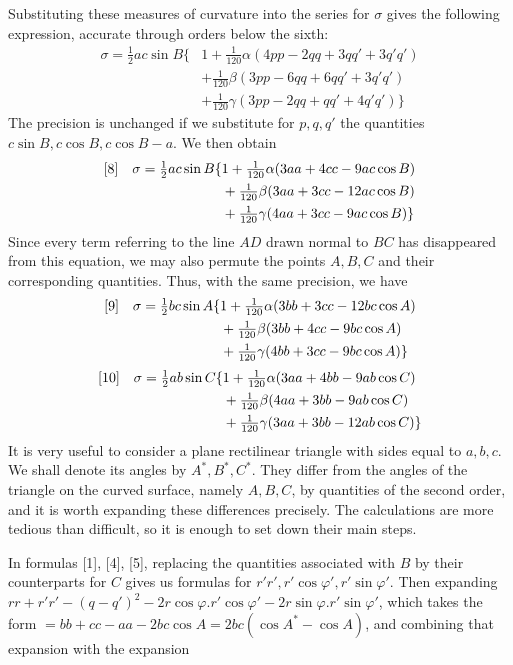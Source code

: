 %
Substituting these measures of curvature into the series for \(\sigma\) gives the following expression, accurate through orders below the sixth:
\[
\begin{aligned}
\sigma=\tfrac{1}{2}ac\sin B\{&1+\tfrac{1}{120}\alpha(4pp-2qq+3qq'+3q'q')\\
&+\tfrac{1}{120}\beta(3pp-6qq+6qq'+3q'q')\\
&+\tfrac{1}{120}\gamma(3pp-2qq+qq'+4q'q')\}
\end{aligned}
\]
The precision is unchanged if we substitute for \(p,q,q'\) the quantities \(c\sin B,c\cos B,c\cos B-a\). We then obtain
\[
\begin{aligned}
\relax[8]\quad\sigma=\tfrac{1}{2}ac\sin B\{&1+\tfrac{1}{120}\alpha(3aa+4cc-9ac\cos B)\\
&+\tfrac{1}{120}\beta(3aa+3cc-12ac\cos B)\\
&+\tfrac{1}{120}\gamma(4aa+3cc-9ac\cos B)\}
\end{aligned}
\]
Since every term referring to the line \(AD\) drawn normal to \(BC\) has disappeared from this equation, we may also permute the points \(A,B,C\) and their corresponding quantities. Thus, with the same precision, we have
\[
\begin{aligned}
\relax[9]\quad\sigma=\tfrac{1}{2}bc\sin A\{&1+\tfrac{1}{120}\alpha(3bb+3cc-12bc\cos A)\\
&+\tfrac{1}{120}\beta(3bb+4cc-9bc\cos A)\\
&+\tfrac{1}{120}\gamma(4bb+3cc-9bc\cos A)\}
\end{aligned}
\]
\[
\begin{aligned}
\relax[10]\quad\sigma=\tfrac{1}{2}ab\sin C\{&1+\tfrac{1}{120}\alpha(3aa+4bb-9ab\cos C)\\
&+\tfrac{1}{120}\beta(4aa+3bb-9ab\cos C)\\
&+\tfrac{1}{120}\gamma(3aa+3bb-12ab\cos C)\}
\end{aligned}
\]
It is very useful to consider a plane rectilinear triangle with sides equal to \(a,b,c\). We shall denote its angles by \(A^*,B^*,C^*\). They differ from the angles of the triangle on the curved surface, namely \(A,B,C\), by quantities of the second order, and it is worth expanding these differences precisely. The calculations are more tedious than difficult, so it is enough to set down their main steps.

In formulas [1], [4], [5], replacing the quantities associated with \(B\) by their counterparts for \(C\) gives us formulas for \(r'r',r'\cos\varphi',r'\sin\varphi'\). Then expanding \(rr+r'r'-(q-q')^2-2r\cos\varphi\mathord{.}r'\cos\varphi'-2r\sin\varphi\mathord{.}r'\sin\varphi'\), which takes the form \(=bb+cc-aa-2bc\cos A=2bc(\cos A^*-\cos A)\), and combining that expansion with the expansion
